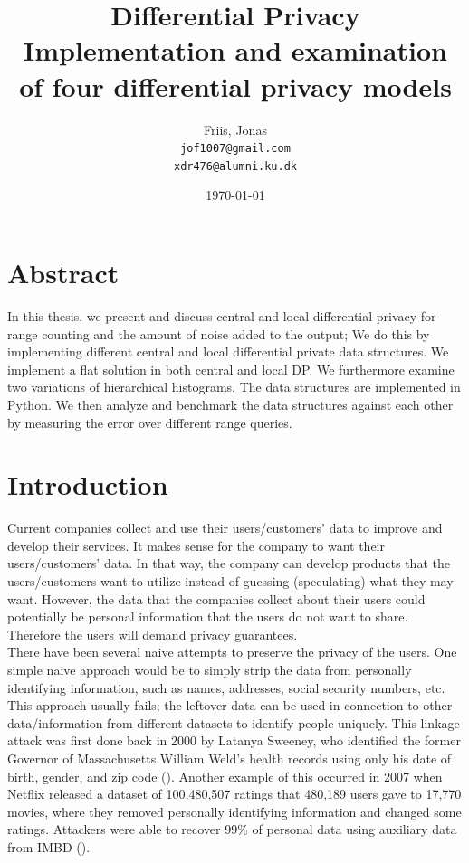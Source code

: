 \documentclass[11pt]{article}
\title{
  \vspace{3cm}
  \Huge{Differential Privacy} \\
  \Large{Implementation and examination of four differential privacy models}
}
\author{
  \Large{Friis, Jonas}
  \\ \texttt{jof1007@gmail.com} \\
\texttt{xdr476@alumni.ku.dk}
}
\date{
    \today
}
\theoremstyle{definition}
\def \ColourPDF {include/ku-farve}
\def \TitlePDF   {include/nat-en}  %
\begin{document}


\clearpage\maketitle
\thispagestyle{empty}

\newpage

\section{Abstract}
In this thesis, we present and discuss central and local differential privacy for range counting and the amount of noise added to the output; We do this by implementing different central and local differential private data structures. We implement a flat solution in both central and local DP. We furthermore examine two variations of hierarchical histograms. The data structures are implemented in Python. We then analyze and benchmark the data structures against each other by measuring the error over different range queries.


\newpage
\tableofcontents
\newpage
\section{Introduction}
Current companies collect and use their users/customers' data to improve and develop their services. It makes sense for the company to want their users/customers' data. In that way, the company can develop products that the users/customers want to utilize instead of guessing (speculating) what they may want. However, the data that the companies collect about their users could potentially be personal information that the users do not want to share. Therefore the users will demand privacy guarantees. \\

\noindent There have been several naive attempts to preserve the privacy of the users.  One simple naive approach would be to simply strip the data from personally identifying information, such as names, addresses, social security numbers, etc. This approach usually fails; the leftover data can be used in connection to other data/information from different datasets to identify people uniquely. This linkage attack was first done back in 2000 by Latanya Sweeney, who identified the former Governor of Massachusetts William Weld's health records using only his date of birth, gender, and zip code (\cite{Sweeney}). Another example of this occurred in 2007 when Netflix released a dataset of 100,480,507 ratings that 480,189 users gave to 17,770 movies, where they removed personally identifying information and changed some ratings. Attackers were able to recover 99\% of personal data using auxiliary data from IMBD (\cite{netflix}). \\
\end{document}
